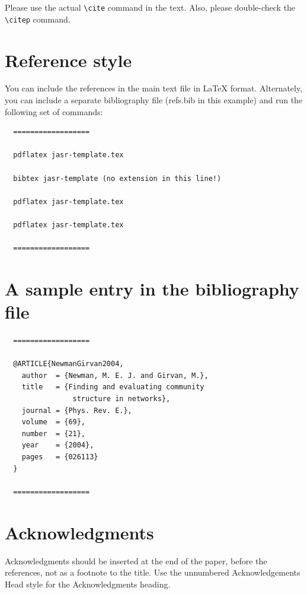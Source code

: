 \documentclass[times,authoryear]{elsarticle}
\begin{document}
Please use the actual \verb+\cite+ command in the text.
Also, please double-check the \verb+\citep+ command.

\section{Reference style}
You can include the references in the main text file in \LaTeX
format. Alternately, you can include a separate bibliography
file (refs.bib in this example) and run the following set of
commands:
\begin{verbatim}
  ==================

  pdflatex jasr-template.tex

  bibtex jasr-template (no extension in this line!)

  pdflatex jasr-template.tex

  pdflatex jasr-template.tex

  ==================
  \end{verbatim}

\section{A sample entry in the bibliography file}
\begin{verbatim}
  ==================

  @ARTICLE{NewmanGirvan2004,
    author  = {Newman, M. E. J. and Girvan, M.},
    title   = {Finding and evaluating community 
                structure in networks},
    journal = {Phys. Rev. E.},
    volume  = {69},
    number  = {21},
    year    = {2004},
    pages   = {026113}
  }

  ==================
  \end{verbatim}

\section*{Acknowledgments}
Acknowledgments should be inserted at the end of the paper,
before the references, not as a footnote to the title. Use the
unnumbered Acknowledgements Head style for the Acknowledgments
heading.



\end{document}
